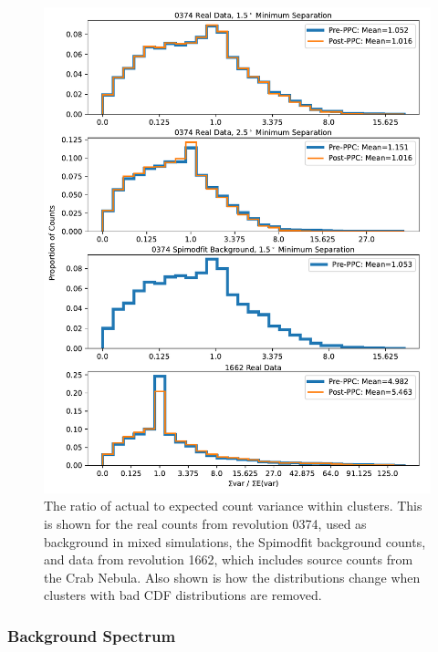 \documentclass{report}
\begin{document}
\begin{figure}[h]
  \centering
  \includegraphics[width=\textwidth]{Images/PPC_and_Background_Analysis/background_variance.pdf}
  \caption{The ratio of actual to expected count variance within clusters. This is shown for the real counts from revolution 0374, used as background in mixed simulations, the Spimodfit background counts, and data from revolution 1662, which includes source counts from the Crab Nebula. Also shown is how the distributions change when clusters with bad CDF distributions are removed.}
  \label{fig back var}
\end{figure}

\FloatBarrier

\subsubsection{Background Spectrum}
\end{document}
